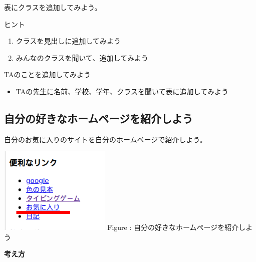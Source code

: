 \documentclass[a4paper,12pt]{jarticle}
\begin{document}
\bigskip

\bigskip

\bigskip

\theQuestion

表にクラスを追加してみよう。

ヒント

\begin{enumerate}
  \item クラスを見出しに追加してみよう
  \item
        みんなのクラスを聞いて、追加してみよう
\end{enumerate}
\theQuestion

TAのことを追加してみよう

\begin{itemize}
  \item
        TAの先生に名前、学校、学年、クラスを聞いて表に追加してみよう
\end{itemize}

\bigskip

\clearpage

\subsection{\theExercise 自分の好きなホームページを紹介しよう}
自分のお気に入りのサイトを自分のホームページで紹介しよう。



\centering
\begin{minipage}{\textwidth}
  {\upshape
    \centering
    \includegraphics[width=0.4\textwidth]{textbook-img193.png}
    \newline
    Figure :
    自分の好きなホームページを紹介しよう}
\end{minipage}



\bigskip

\flushleft

\textbf{考え方}
\end{document}
